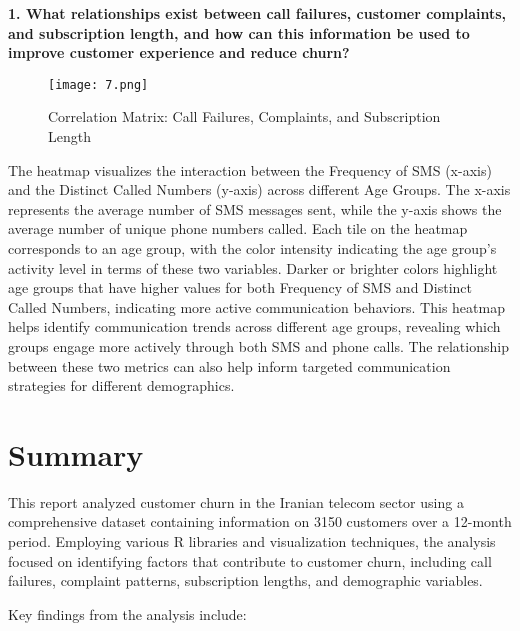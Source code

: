 \documentclass[12pt]{article}
\begin{document}
\vspace{0.5cm}
\textbf{1. What relationships exist between call failures, customer complaints, and subscription length, and how can this information be used to improve customer experience and reduce churn?}
\begin{figure}[h]
    \centering
    \texttt{[image: 7.png]}  
    \caption{Correlation Matrix: Call Failures, Complaints, and Subscription Length}
\end{figure}
\FloatBarrier
The heatmap visualizes the interaction between the Frequency of SMS (x-axis) and the Distinct Called Numbers (y-axis) across different Age Groups. The x-axis represents the average number of SMS messages sent, while the y-axis shows the average number of unique phone numbers called. Each tile on the heatmap corresponds to an age group, with the color intensity indicating the age group’s activity level in terms of these two variables. Darker or brighter colors highlight age groups that have higher values for both Frequency of SMS and Distinct Called Numbers, indicating more active communication behaviors. This heatmap helps identify communication trends across different age groups, revealing which groups engage more actively through both SMS and phone calls. The relationship between these two metrics can also help inform targeted communication strategies for different demographics.



\section{Summary}
This report analyzed customer churn in the Iranian telecom sector using a comprehensive dataset containing information on 3150 customers over a 12-month period. Employing various R libraries and visualization techniques, the analysis focused on identifying factors that contribute to customer churn, including call failures, complaint patterns, subscription lengths, and demographic variables.

\vspace{0.5cm}
Key findings from the analysis include:
\end{document}
